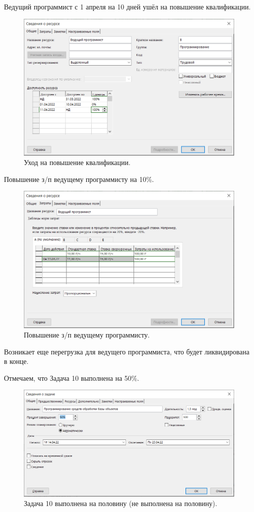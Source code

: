 \documentclass[a4paper,14pt]{extreport} %
\begin{document}
\begin{enumerate}
Ведущий программист с 1 апреля на 10 дней ушёл на повышение квалификации.
\begin{figure}[H]
	\centering
	\caption{Уход на повышение квалификации. }
	\includegraphics[scale=0.8]{powerup}
\end{figure}

Повышение з/п ведущему программисту на 10\%.
\begin{figure}[H]
	\centering
	\caption{Повышение з/п ведущему программисту. }
	\includegraphics[scale=0.8]{powerup2}
\end{figure}

Возникает еще перегрузка для ведущего программиста, что будет ликвидирована в конце.

Отмечаем, что Задача 10 выполнена на 50\%.
\begin{figure}[H]
	\centering
	\caption{Задача 10 выполнена на половину (не выполнена на половину). }
	\includegraphics[scale=0.8]{task10}
\end{figure}


\end{enumerate}
\end{document}
